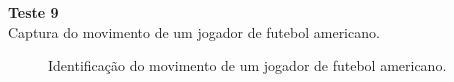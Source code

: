 \textbf{Teste 9}\\
Captura do movimento de um jogador de futebol americano.

\begin{figure}
    \centering
    \caption{Identificação do movimento de um jogador de futebol americano.}
\end{figure}